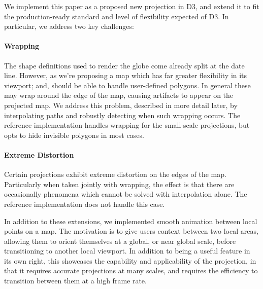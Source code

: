 We implement this paper as a proposed new projection in D3, and extend it to
  fit the production-ready standard and level of flexibility expected of D3.
In particular, we address two key challenges:

\paragraph{Wrapping}
The shape definitions used to render the globe come already split at the date
  line.
However, as we're proposing a map which has far greater flexibility in its
  viewport; and, should be able to handle user-defined polygons.
In general these may wrap around the edge of the map, causing artifacts to
  appear on the projected map.
We address this problem, described in more detail later, by interpolating paths
  and robustly detecting when such wrapping occurs.
The reference implementation handles wrapping for the small-scale projections,
  but opts to hide invisible polygons in most cases.

\paragraph{Extreme Distortion}
Certain projections exhibit extreme distortion on the edges of the map.
Particularly when taken jointly with wrapping, the effect is that there are
  occasionally phenomena which cannot be solved with interpolation alone.
The reference implementation does not handle this case.

In addition to these extensions, we implemented smooth animation between
  local points on a map.
The motivation is to give users context between two local areas, allowing them
  to orient themselves at a global, or near global scale, before transitioning
  to another local viewport.
In addition to being a useful feature in its own right, this showcases the
  capability and applicability of the projection, in that it requires accurate
  projections at many scales, and requires the efficiency to transition
  between them at a high frame rate.
